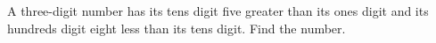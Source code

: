 A three-digit number has its tens digit five greater than its ones digit and its hundreds digit eight less than its tens digit. Find the number.
